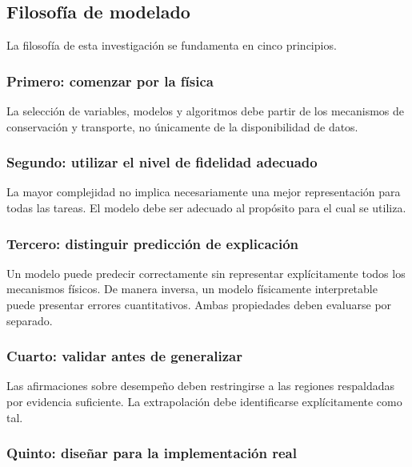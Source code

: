\subsection{Filosofía de modelado}
\label{subsec:filosofia_modelado}

La filosofía de esta investigación se fundamenta en cinco principios.

\subsubsection*{Primero: comenzar por la física}

La selección de variables, modelos y algoritmos debe partir de los mecanismos de conservación y transporte, no únicamente de la disponibilidad de datos.

\subsubsection*{Segundo: utilizar el nivel de fidelidad adecuado}

La mayor complejidad no implica necesariamente una mejor representación para todas las tareas. El modelo debe ser adecuado al propósito para el cual se utiliza.

\subsubsection*{Tercero: distinguir predicción de explicación}

Un modelo puede predecir correctamente sin representar explícitamente todos los mecanismos físicos. De manera inversa, un modelo físicamente interpretable puede presentar errores cuantitativos. Ambas propiedades deben evaluarse por separado.

\subsubsection*{Cuarto: validar antes de generalizar}

Las afirmaciones sobre desempeño deben restringirse a las regiones respaldadas por evidencia suficiente. La extrapolación debe identificarse explícitamente como tal.

\subsubsection*{Quinto: diseñar para la implementación real}


